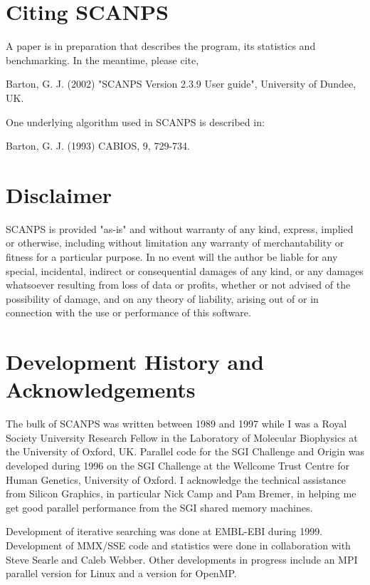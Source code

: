 \documentclass[12pt]{article}
\begin{document}
\section{Citing SCANPS}

A paper is in preparation that describes the program, its statistics
and benchmarking.  In the meantime, please cite,

Barton, G. J. (2002) "SCANPS Version 2.3.9 User guide", University of Dundee, UK.

One underlying algorithm used in SCANPS is described in:

Barton, G. J. (1993) CABIOS, 9, 729-734.


\section{Disclaimer}

SCANPS is provided "as-is" and without warranty of any kind, express,
implied or otherwise, including without limitation any warranty of
merchantability or fitness for a particular purpose. In no event will
the author be liable for any special, incidental, indirect or
consequential damages of any kind, or any damages whatsoever resulting
from loss of data or profits, whether or not advised of the
possibility of damage, and on any theory of liability, arising out of
or in connection with the use or performance of this software.

\section{Development History and Acknowledgements}

The bulk of SCANPS was written between 1989 and 1997 while I was a
Royal Society University Research Fellow in the Laboratory of
Molecular Biophysics at the University of Oxford, UK.  Parallel code
for the SGI Challenge and Origin was developed during 1996 on the SGI
Challenge at the Wellcome Trust Centre for Human Genetics, University
of Oxford.  I acknowledge the technical assistance from Silicon
Graphics, in particular Nick Camp and Pam Bremer, in helping me get 
good parallel performance from the SGI shared memory machines.

Development of iterative searching was done at EMBL-EBI during 1999.
Development of MMX/SSE code and statistics were done in collaboration
with Steve Searle and Caleb Webber.  Other developments in progress
include an MPI parallel version for Linux and a version for OpenMP.
\end{document}

